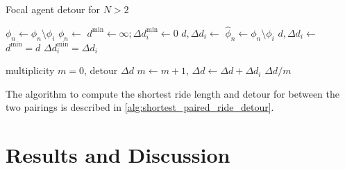\documentclass[aps,pra,showpacs,preprintnumbers,amsmath,amssymb,nofootinbib]{revtex4-2}
\begin{document}
    \begin{algorithm}[H]
        \caption{Focal agent detour for $N > 2$}
        \label{alg:focal_agent_detour_ng2}  
             
        \begin{algorithmic}[1]
                 
                        \State $\phi_n \leftarrow \phi_n \setminus \phi_i$
                    \EndIf
                \EndFor
                \State $\phi_n \leftarrow $  
                \State $d^{\mathrm{min}} \leftarrow \infty; \Delta d_i^{\mathrm{min}} \leftarrow 0$                 
                 
                    \State $d, \Delta d_i \leftarrow $ 
                \Else {}
                        \State $\hat{\phi}_n \leftarrow \phi_n \setminus \phi_i$ 
                        \State $d, \Delta d_i \leftarrow $ 
                            \State $d^{\mathrm{min}} = d$
                            \State $\Delta d_i^{\mathrm{min}} = \Delta d_i$
                        \EndIf
                    \EndFor
                \EndIf

                \State \Return {}
            \EndProcedure
            \Statex
                \State multiplicity $m = 0$, detour $\Delta d$
                        \State $m \leftarrow m + 1$, $\Delta d \leftarrow \Delta d + \Delta d_i$ 
                    \EndIf
                \EndFor
                \State \Return $\Delta d / m$
            \EndProcedure
        \end{algorithmic}      
    \end{algorithm}
    The algorithm to compute the shortest ride length and detour for between the two pairings is described in \cref{alg:shortest_paired_ride_detour}.

    \section{Results and Discussion}
\end{document}
